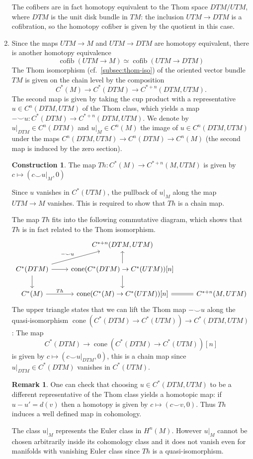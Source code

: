 \documentclass{scrartcl}
\theoremstyle{plain}
\theoremstyle{definition}
\newtheorem{remark}[theorem]{Remark}
\newtheorem{construction}[theorem]{Construction}
\newcommand{\cupp}{\mathbin{\smile}}
\DeclareMathOperator{\cone}{cone}
\DeclareMathOperator{\cofib}{cofib}
\newcommand{\quiso}{\simeq}
\newcommand{\blank}{-}
\begin{document}
\begin{enumerate}[(1)]
The cofibers are in fact homotopy equivalent to the Thom space $DTM / UTM$, where $DTM$ is the unit disk bundle in $TM$: the inclusion $UTM\to DTM$ is a cofibration, so the homotopy cofiber is given by the quotient in this case. 

\item Since the maps $UTM\to M$ and $UTM\to DTM$ are homotopy equivalent, there is another homotopy equivalence
$$\cofib(UTM\to M)\quiso \cofib(UTM\to DTM)$$
The Thom isomorphism (cf.\ \cref{subsec:thom-iso}) of the oriented vector bundle $TM$ is given on the chain level by the composition  $$C^*(M) \to C^*(DTM)\to C^{*+n}(DTM, UTM).$$ The second map is given by taking the cup product with a representative $u\in C^n(DTM, UTM)$ of the Thom class, which yields a map $\blank\cupp u\colon C^*(DTM)\to C^{*+n}(DTM, UTM)$. We denote by $u|_{DTM}\in C^n(DTM)$ and $u|_M\in C^n(M)$ the image of $u\in C^n(DTM, UTM)$ under the maps $C^n(DTM, UTM)\to C^n(DTM)\to C^n(M)$ (the second map is induced by the zero section). 


\begin{construction}\label{constr:thom-map-cfg-spaces}
    The map $Th\colon C^*(M) \to C^{*+n}(M, UTM)$ is given by $c\mapsto (c\cupp u|_M, 0)$
\end{construction}
Since $u$ vanishes in $C^*(UTM)$, the pullback of $u|_M$ along the map $UTM\to M$ vanishes. This is required to show that $Th$ is a chain map. 

The map $Th$ fits into the following commutative diagram, which shows that $Th$ is in fact related to the Thom isomorphism.
\begin{equation}\label{diag:thom-map-construction}\begin{tikzcd}
     & C^{*+n}(DTM, UTM) & \\
    C^*(DTM)\dar \rar\ar[ur, "\blank\cupp u"]& \cone(C^*(DTM)\to C^*(UTM))[n] \dar\uar & \\
    C^*(M) \rar["Th"] & \cone(C^*(M)\to C^*(UTM))[n] \rar[equal] & C^{*+n}(M, UTM) 
\end{tikzcd}\end{equation}
The upper triangle states that we can lift the Thom map $\blank\cupp u$ along the quasi-isomorphism $\cone(C^*(DTM)\to C^*(UTM))\to C^*(DTM, UTM)$: The map $$C^*(DTM)\to \cone(C^*(DTM)\to C^*(UTM))[n]$$
is given by $c\mapsto (c\cupp u|_{DTM}, 0)$, this is a chain map since $u|_{DTM}\in C^*(DTM)$ vanishes in $C^*(UTM)$. 

\begin{remark}
    One can check that choosing $u\in C^*(DTM, UTM)$ to be a different representative of the Thom class yields a homotopic map: if $u-u'= d(v)$ then a homotopy is given by $c\mapsto (c\cupp v, 0)$. Thus $Th$ induces a well defined map in cohomology. 

    The class $u|_M$ represents the Euler class in $H^n(M)$. However $u|_M$ cannot be chosen arbitrarily inside its cohomology class and it does not vanish even for manifolds with vanishing Euler class since $Th$ is a quasi-isomorphism. 
\end{remark}

\end{enumerate}
\end{document}
